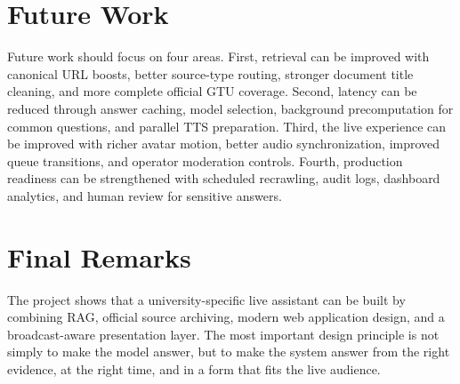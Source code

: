 \section{Future Work}

Future work should focus on four areas. First, retrieval can be improved with canonical URL boosts, better source-type routing, stronger document title cleaning, and more complete official GTU coverage. Second, latency can be reduced through answer caching, model selection, background precomputation for common questions, and parallel TTS preparation. Third, the live experience can be improved with richer avatar motion, better audio synchronization, improved queue transitions, and operator moderation controls. Fourth, production readiness can be strengthened with scheduled recrawling, audit logs, dashboard analytics, and human review for sensitive answers.

\section{Final Remarks}

The project shows that a university-specific live assistant can be built by combining RAG, official source archiving, modern web application design, and a broadcast-aware presentation layer. The most important design principle is not simply to make the model answer, but to make the system answer from the right evidence, at the right time, and in a form that fits the live audience.
